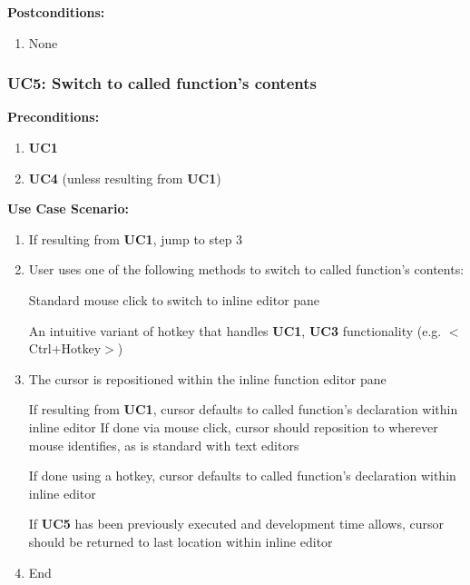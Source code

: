\documentclass[]{report}
\begin{document}
		\noindent\textbf{Postconditions:}
		
		\begin{enumerate}
			
			\item 
			None
			
		\end{enumerate}
		
		\vspace{0.25in}
		
		\subsubsection{UC5:  Switch to called function's contents}
		
		\textbf{Preconditions:}
		
		\begin{enumerate}
			
			\item \textbf{UC1}
			
			\item \textbf{UC4} (unless resulting from \textbf{UC1})
			
		\end{enumerate}
		
		\noindent\textbf{Use Case Scenario:}
		
		\begin{enumerate}
			
			\item 
			If resulting from \textbf{UC1}, jump to step 3
			
			\item
			User uses one of the following methods to switch to called function's contents:
			
				\subitem
				Standard mouse click to switch to inline editor pane
				
				\subitem
				An intuitive variant of hotkey that handles \textbf{UC1}, \textbf{UC3} functionality (e.g. $<$Ctrl+Hotkey$>$)
			
			\item 
			The cursor is repositioned within the inline function editor pane
			
				\subitem
				If resulting from \textbf{UC1}, cursor defaults to called function's declaration within inline editor
				\subitem
				If done via mouse click, cursor should reposition to wherever mouse identifies, as is standard with text editors
				
				\subitem
				If done using a hotkey, cursor defaults to called function's declaration within inline editor
				
					\subsubitem
					If \textbf{UC5} has been previously executed and development time allows, cursor should be returned to last location within inline editor
			
			\item
			End
		\end{enumerate}
		
\end{document}
